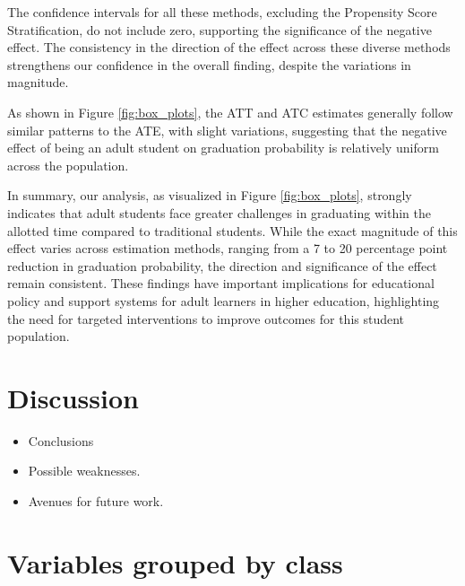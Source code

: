 \documentclass{article}
\newcommand{\gur}[1]{{\color{teal}{Gur: #1}}}
\begin{document}
The confidence intervals for all these methods, excluding the Propensity Score Stratification, do not include zero, supporting the significance of the negative effect. The consistency in the direction of the effect across these diverse methods strengthens our confidence in the overall finding, despite the variations in magnitude. 

As shown in Figure \ref{fig:box_plots}, the ATT and ATC estimates generally follow similar patterns to the ATE, with slight variations, suggesting that the negative effect of being an adult student on graduation probability is relatively uniform across the population.

In summary, our analysis, as visualized in Figure \ref{fig:box_plots}, strongly indicates that adult students face greater challenges in graduating within the allotted time compared to traditional students. While the exact magnitude of this effect varies across estimation methods, ranging from a 7 to 20 percentage point reduction in graduation probability, the direction and significance of the effect remain consistent. These findings have important implications for educational policy and support systems for adult learners in higher education, highlighting the need for targeted interventions to improve outcomes for this student population.

\gur{Currently it is all Claude with a close guidance by me, probably need to refine in some points but this is the general idea.}

\section{Discussion}

\begin{itemize}
    \item Conclusions
    \item Possible weaknesses.
    \item Avenues for future work.
\end{itemize}




\appendix

\newpage
\section{Variables grouped by class}
\end{document}
